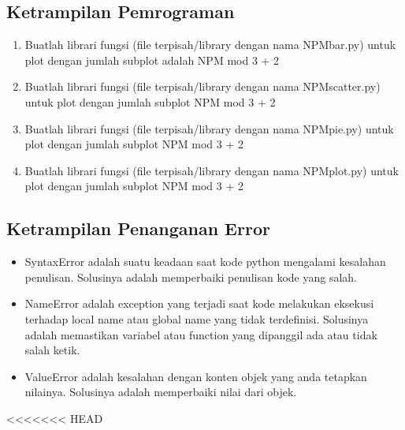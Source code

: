 \subsection{Ketrampilan Pemrograman}
\begin{enumerate}
    \item Buatlah librari fungsi (file terpisah/library dengan nama NPMbar.py) untuk plot dengan jumlah subplot adalah NPM mod 3 + 2
    
    
    \item Buatlah librari fungsi (file terpisah/library dengan nama NPMscatter.py) untuk plot dengan jumlah subplot NPM mod 3 + 2
    
    
    \item Buatlah librari fungsi (file terpisah/library dengan nama NPMpie.py) untuk plot dengan jumlah subplot NPM mod 3 + 2
    
    
    \item Buatlah librari fungsi (file terpisah/library dengan nama NPMplot.py) untuk plot dengan jumlah subplot NPM mod 3 + 2
    
\end{enumerate}

\subsection{Ketrampilan Penanganan Error}
\begin{itemize}
    \item SyntaxError adalah suatu keadaan saat kode python mengalami kesalahan penulisan. Solusinya adalah memperbaiki penulisan kode yang salah.
    
    \item NameError adalah exception yang terjadi saat kode melakukan eksekusi terhadap local name atau global name yang tidak terdefinisi. Solusinya adalah memastikan variabel atau function yang dipanggil ada atau tidak salah ketik.
    
    \item ValueError adalah kesalahan dengan konten objek yang anda tetapkan nilainya. Solusinya adalah memperbaiki nilai dari objek.
    
\end{itemize}
<<<<<<< HEAD


